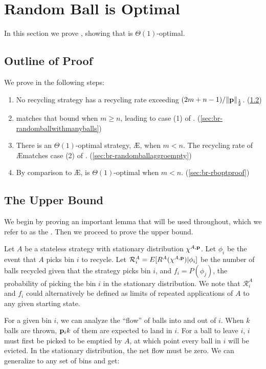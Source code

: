 \section{Random Ball is Optimal}\label{sec:br-nonuniform}

In this section we prove , showing that \RB{} is
$\Theta(1)$-optimal. 

\subsection{Outline of Proof}\label{sec:br-nonuni-outline}
We prove  in the following steps:
\begin{enumerate}
	\item No recycling strategy has a recycling rate exceeding
		$(2m+n-1)/\|\mathbf{p}\|_{\frac{1}{2}}$. (\cref{sec:br-upper-statement})
	\item \RB{} matches that bound when $m \geq n$, leading to case (1) of
		. (\cref{sec:br-randomballwithmanyballs})
	\item There is an $\Theta(1)$-optimal strategy, \AE{}, when $m < n$. The
		recycling rate of \AE matches case (2) of .
		(\cref{sec:br-randomballaggroempty})
	\item By comparison to \AE{}, \RB{} is $\Theta(1)$-optimal when $m < n$.
		(\cref{sec:br-rboptproof})
\end{enumerate}

\subsection{The Upper Bound}\label{sec:br-upper-statement}
We begin by proving an important lemma that will be used throughout, which we
refer to as the . Then we proceed to prove the upper bound.

Let $A$ be a stateless strategy with stationary distribution $\chi^{A,\mathbf{p}}$. Let
$\phi_i$ be the event that $A$ picks bin $i$ to recycle. Let $\mathcal{R}_i^A =
E[R^A(\chi^{A,\mathbf{p}}) | \phi_i]$ be the number of balls recycled given that the
strategy picks bin $i$, and $f_i = P(\phi_j)$, the probability of picking the
bin $i$ in the stationary distribution. We note that $\mathcal{R}_i^A$ and
$f_i$ could alternatively be defined as limits of repeated applications of $A$
to any given starting state.

For a given bin $i$, we can analyze the ``flow'' of balls into and out of $i$.
When $k$ balls are thrown, $\mathbf{p}_ik$ of them are expected to land in $i$. For a
ball to leave $i$, $i$ must first be picked to be emptied by $A$, at which
point every ball in $i$ will be evicted. In the stationary distribution, the
net flow must be zero.  We can generalize to any set of bins and get:

